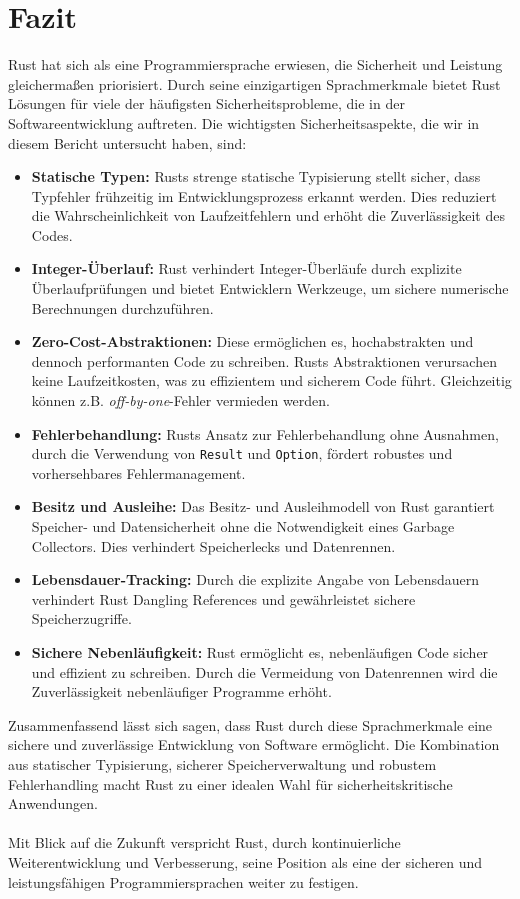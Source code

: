 \chapter{Fazit}

Rust hat sich als eine Programmiersprache erwiesen, die Sicherheit und Leistung gleichermaßen priorisiert. 
Durch seine einzigartigen Sprachmerkmale bietet Rust Lösungen für viele der häufigsten Sicherheitsprobleme, die in der Softwareentwicklung auftreten. 
Die wichtigsten Sicherheitsaspekte, die wir in diesem Bericht untersucht haben, sind:

\begin{itemize}
    \item \textbf{Statische Typen:} Rusts strenge statische Typisierung stellt sicher, dass Typfehler frühzeitig im Entwicklungsprozess erkannt werden. 
      Dies reduziert die Wahrscheinlichkeit von Laufzeitfehlern und erhöht die Zuverlässigkeit des Codes.
    \item \textbf{Integer-Überlauf:} Rust verhindert Integer-Überläufe durch explizite Überlaufprüfungen und bietet Entwicklern Werkzeuge, um sichere numerische Berechnungen durchzuführen.

    \item \textbf{Zero-Cost-Abstraktionen:} Diese ermöglichen es, hochabstrakten und dennoch performanten Code zu schreiben. 
      Rusts Abstraktionen verursachen keine Laufzeitkosten, was zu effizientem und sicherem Code führt. Gleichzeitig können z.B. \textit{\gls{off-by-one}}-Fehler vermieden werden.

    \item \textbf{Fehlerbehandlung:} Rusts Ansatz zur Fehlerbehandlung ohne Ausnahmen, durch die Verwendung von \texttt{Result} und \texttt{Option}, fördert robustes und vorhersehbares Fehlermanagement.

    \item \textbf{Besitz und Ausleihe:} Das Besitz- und Ausleihmodell von Rust garantiert Speicher- und Datensicherheit ohne die Notwendigkeit eines Garbage Collectors. 
      Dies verhindert Speicherlecks und Datenrennen.

    \item \textbf{Lebensdauer-Tracking:} Durch die explizite Angabe von Lebensdauern verhindert Rust Dangling References und gewährleistet sichere Speicherzugriffe.

    \item \textbf{Sichere Nebenläufigkeit:} Rust ermöglicht es, nebenläufigen Code sicher und effizient zu schreiben. 
      Durch die Vermeidung von Datenrennen wird die Zuverlässigkeit nebenläufiger Programme erhöht.    
\end{itemize}
\noindent
Zusammenfassend lässt sich sagen, dass Rust durch diese Sprachmerkmale eine sichere und zuverlässige Entwicklung von Software ermöglicht. 
Die Kombination aus statischer Typisierung, sicherer Speicherverwaltung und robustem Fehlerhandling macht Rust zu einer idealen Wahl für sicherheitskritische Anwendungen.\\
\\
Mit Blick auf die Zukunft verspricht Rust, durch kontinuierliche Weiterentwicklung und Verbesserung, seine Position als eine der sicheren und leistungsfähigen Programmiersprachen weiter zu festigen.
